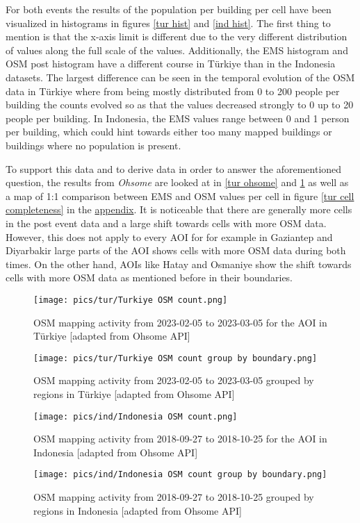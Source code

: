 \documentclass[oneside,twocolumn,10pt,cleanfoot,cleanhead]{asme2ej}
\begin{document}
For both events the results of the population per building per cell have been visualized in histograms in figures \ref{tur hist} and \ref{ind hist}.
The first thing to mention is that the x-axis limit is different due to the very different distribution of values along the full scale of the values.
Additionally, the EMS histogram and OSM post histogram have a different course in Türkiye than in the Indonesia datasets.
The largest difference can be seen in the temporal evolution of the OSM data in Türkiye where from being mostly distributed from 0 to 200 people per building the counts evolved so as that the values decreased strongly to 0 up to 20 people per building.
In Indonesia, the EMS values range between 0 and 1 person per building, which could hint towards either too many mapped buildings or buildings where no population is present.

To support this data and to derive data in order to answer the aforementioned question, the results from \textit{Ohsome} are looked at in \ref{tur ohsome} and \ref{tur ohsome regions} as well as a map of 1:1 comparison between EMS and OSM values per cell in figure \ref{tur cell completeness} in the \hyperref[appendix]{appendix}.
It is noticeable that there are generally more cells in the post event data and a large shift towards cells with more OSM data.
However, this does not apply to every AOI for for example in Gaziantep and Diyarbakir large parts of the AOI shows cells with more OSM data during both times.
On the other hand, AOIs like Hatay and Osmaniye show the shift towards cells with more OSM data as mentioned before in their boundaries.

\begin{figure}[h!]
    \centerline{\texttt{[image: pics/tur/Turkiye OSM count.png]}}
    \caption{OSM mapping activity from 2023-02-05 to 2023-03-05 for the AOI in Türkiye [adapted from Ohsome API]}
    \label{tur ohsome}
    \vspace{12pt}
    \centerline{\texttt{[image: pics/tur/Turkiye OSM count group by boundary.png]}}
    \caption{OSM mapping activity from 2023-02-05 to 2023-03-05 grouped by regions in Türkiye [adapted from Ohsome API]}
    \label{tur ohsome regions}
\end{figure}

\begin{figure} 
    \centerline{\texttt{[image: pics/ind/Indonesia OSM count.png]}}
    \caption{OSM mapping activity from 2018-09-27 to 2018-10-25 for the AOI in Indonesia [adapted from Ohsome API]}
    \label{ind ohsome}
    \vspace{12pt}
    \centerline{\texttt{[image: pics/ind/Indonesia OSM count group by boundary.png]}}
    \caption{OSM mapping activity from 2018-09-27 to 2018-10-25 grouped by regions in Indonesia [adapted from Ohsome API]}
    \label{ind ohsome regions}
\end{figure}
\end{document}
